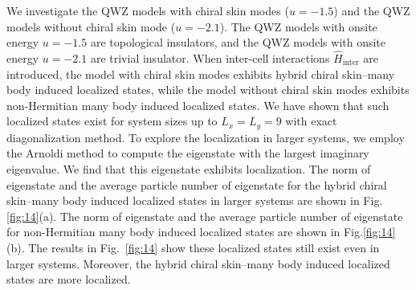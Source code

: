 \documentclass[longbibliography, aps, prx, amsmath, amssymb, amsfonts, twocolumn,superscriptaddress, footinbib]{revtex4-1}
\begin{document}
	We investigate the QWZ models with chiral skin modes ($u = -1.5$) and the QWZ models without chiral skin mode ($u = -2.1$). The QWZ models with onsite energy $u=-1.5$ are topological insulators, and the QWZ models with onsite energy $u = -2.1$ are trivial insulator. When inter-cell interactions $\hat{H}_{\text{inter}}$ are introduced, the model with chiral skin modes exhibits hybrid chiral skin–many body induced localized states, while the model without chiral skin modes exhibits non-Hermitian many body induced localized states.
	We have shown that such localized states exist for system sizes up to $L_x = L_y = 9$ with exact diagonalization method. To explore the localization in larger systems, we employ the Arnoldi method to compute the eigenstate with the largest imaginary eigenvalue. 
	We find that this eigenstate exhibits localization.
	The norm of eigenstate and the average particle number of eigenstate for the hybrid chiral skin–many body induced localized states in larger systems are shown in Fig.\ref{fig:14}(a). 
	The norm of eigenstate and the average particle number of eigenstate for non-Hermitian many body induced localized states are shown in Fig.\ref{fig:14}(b). The results in Fig.~\ref{fig:14} show these localized states still exist even in larger systems. Moreover, the hybrid chiral skin–many body induced localized states are more localized.

\end{document}
